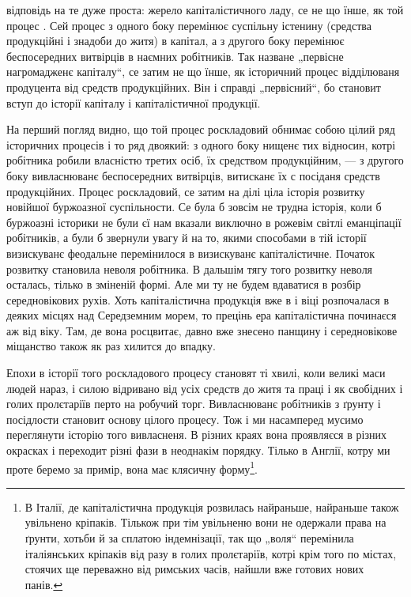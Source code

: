 \parcont{}
відповідь на те дуже проста: жерело капіталістичного ладу,
се не що їнше, як той процес .
Сей процес з одного боку перемінює суспільну істенину
(средства продукційні і знадоби до житя) в капітал, а з другого
боку перемінює беспосередних витвірців в наємних
робітників. Так назване „первісне нагромадженє капіталу“,
се затим не що їнше, як історичний процес відділюваня
продуцента від средств продукційних. Він і справді „первісний“,
бо становит вступ до історії капіталу і капіталістичної
продукції.

На перший погляд видно, що той процес роскладовий
обнимає собою цілий ряд історичних процесів і то ряд двоякий:
з одного боку нищенє тих відносин, котрі робітника
робили власністю третих осіб, їх средством продукційним,
— з другого боку вивласнюванє беспосередних витвірців,
витисканє їх с посіданя средств продукційних. Процес роскладовий,
се затим на ділі ціла історія розвитку новійшої
буржоазної суспільности. Се була б зовсім не трудна історія,
коли б буржоазні історики не були єї нам вказали виключно
в рожевім світлі еманціпації робітників, а були б звернули
увагу й на то, якими способами в тій історії визискуванє
феодальне перемінилося в визискуванє капіталістичне. Початок
розвитку становила неволя робітника. В дальшім тягу
того розвитку неволя осталась, тілько в зміненій формі.
Але ми ту не будем вдаватися в розбір середновікових рухів.
Хоть капіталістична продукція вже в  і  віці розпочалася
в деяких місцях над Середземним морем, то прецінь
ера капіталістична починаєся аж від  віку. Там,
де вона росцвитає, давно вже знесено панщину і середновікове
міщанство також як раз хилится до впадку.

Епохи в історії того роскладового процесу становят ті
хвилі, коли великі маси людей нараз, і силою відривано від
усіх средств до житя та праці і як свобідних і голих пролєтаріїв
перто на робучий торг. Вивласнюванє робітників
з ґрунту і посідлости становит основу цілого процесу. Тож
і ми насамперед мусимо переглянути історію того вивласненя.
В різних краях вона проявляєся в різних окрасках
і переходит різні фази в неоднакім порядку. Тілько в Англії,
котру ми проте беремо за примір, вона має клясичну форму\footnote{
В Італії, де капіталістична продукція розвилась найраньше, найраньше
також увільнено кріпаків. Тількож при тім увільненю вони не
одержали права на ґрунти, хотьби й за сплатою індемнізації, так що
„воля“ перемінила італіянських кріпаків від разу в голих пролєтаріїв, котрі
крім того по містах, стоячих ще переважно від римських часів, найшли
вже готових нових панів.
}.
